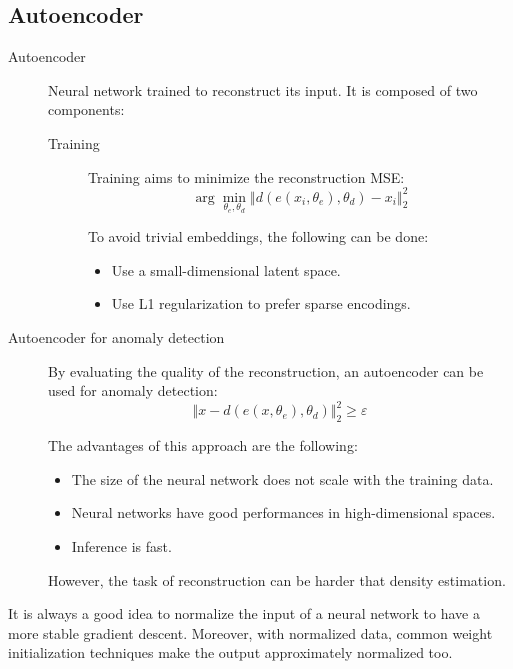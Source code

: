 \subsection{Autoencoder}

\begin{description}
    \item[Autoencoder] 
        Neural network trained to reconstruct its input. It is composed of two components:

        \begin{description}
            \item[Training]
                Training aims to minimize the reconstruction MSE:
                \[ \arg\min_{\theta_e, \theta_d} \left\Vert d\left( e(x_i, \theta_e), \theta_d \right) - x_i \right\Vert_2^2 \]

                To avoid trivial embeddings, the following can be done:
                \begin{itemize}
                    \item Use a small-dimensional latent space.
                    \item Use L1 regularization to prefer sparse encodings.
                \end{itemize}
        \end{description}


    \item[Autoencoder for anomaly detection]
        By evaluating the quality of the reconstruction, an autoencoder can be used for anomaly detection:
        \[ \Vert x - d(e(x, \theta_e), \theta_d) \Vert_2^2 \geq \varepsilon \]
        
        The advantages of this approach are the following:
        \begin{itemize}
            \item The size of the neural network does not scale with the training data.
            \item Neural networks have good performances in high-dimensional spaces.
            \item Inference is fast.
        \end{itemize}

        However, the task of reconstruction can be harder that density estimation.
\end{description}

\begin{remark}
    It is always a good idea to normalize the input of a neural network to have a more stable gradient descent. Moreover, with normalized data, common weight initialization techniques make the output approximately normalized too.
\end{remark}